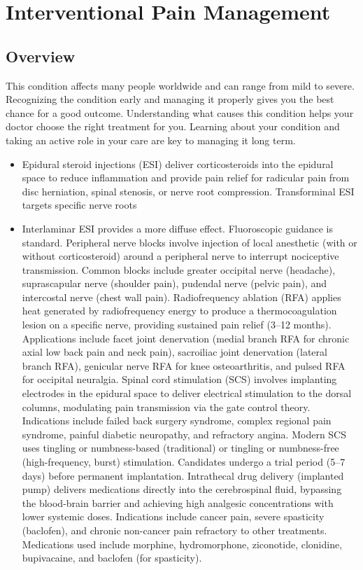 \chapter{Interventional Pain Management}
\label{sec:Interventional Pain Management}

\section{Overview}
This condition affects many people worldwide and can range from mild to severe. Recognizing the condition early and managing it properly gives you the best chance for a good outcome. Understanding what causes this condition helps your doctor choose the right treatment for you. Learning about your condition and taking an active role in your care are key to managing it long term.

\begin{itemize}[noitemsep]
  \item Epidural steroid injections (ESI) deliver corticosteroids into the epidural space to reduce inflammation and provide pain relief for radicular pain from disc herniation, spinal stenosis, or nerve root compression. Transforminal ESI targets specific nerve roots
  \item Interlaminar ESI provides a more diffuse effect. Fluoroscopic guidance is standard. Peripheral nerve blocks involve injection of local anesthetic (with or without corticosteroid) around a peripheral nerve to interrupt nociceptive transmission. Common blocks include greater occipital nerve (headache), suprascapular nerve (shoulder pain), pudendal nerve (pelvic pain), and intercostal nerve (chest wall pain). Radiofrequency ablation (RFA) applies heat generated by radiofrequency energy to produce a thermocoagulation lesion on a specific nerve, providing sustained pain relief (3--12 months). Applications include facet joint denervation (medial branch RFA for chronic axial low back pain and neck pain), sacroiliac joint denervation (lateral branch RFA), genicular nerve RFA for knee osteoarthritis, and pulsed RFA for occipital neuralgia. Spinal cord stimulation (SCS) involves implanting electrodes in the epidural space to deliver electrical stimulation to the dorsal columns, modulating pain transmission via the gate control theory. Indications include failed back surgery syndrome, complex regional pain syndrome, painful diabetic neuropathy, and refractory angina. Modern SCS uses tingling or numbness-based (traditional) or tingling or numbness-free (high-frequency, burst) stimulation. Candidates undergo a trial period (5--7 days) before permanent implantation. Intrathecal drug delivery (implanted pump) delivers medications directly into the cerebrospinal fluid, bypassing the blood-brain barrier and achieving high analgesic concentrations with lower systemic doses. Indications include cancer pain, severe spasticity (baclofen), and chronic non-cancer pain refractory to other treatments. Medications used include morphine, hydromorphone, ziconotide, clonidine, bupivacaine, and baclofen (for spasticity).
\end{itemize}

